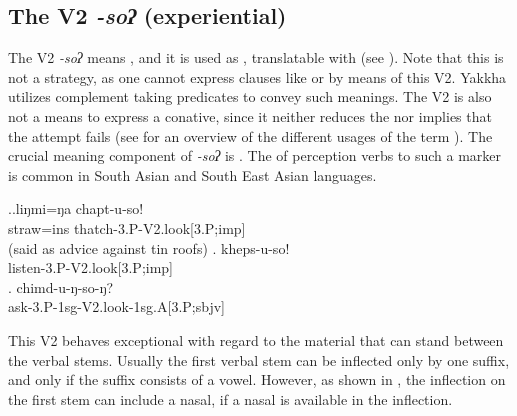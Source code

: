 \subsection{The V2 \emph{-soʔ}  (experiential)}\label{V2-look}%

The V2 \emph{-soʔ} means , and it is used as , translatable with  (see \Next). Note that this is not a  strategy,  as one cannot express clauses like  or  by means of  this V2. Yakkha utilizes complement taking predicates to convey such meanings. The V2 is also not a means to express a conative, since it neither  reduces the  nor implies that the attempt fails (see \citet{Vincent2013_Conative} for an overview of the different usages of the term ). The crucial meaning component of \emph{-soʔ} is . The  of  perception verbs to such a marker is common in South Asian and South East Asian languages. 

\ex.\ag.liŋmi=ŋa chapt-u-so!\\
straw{\sc =ins} thatch{\sc -3.P-V2.look[3.P;imp]}\\
 (said as advice against tin roofs)
\bg. kheps-u-so!\\
listen{\sc-3.P-V2.look[3.P;imp]}\\
\bg. chimd-u-ŋ-so-ŋ?\\
ask{\sc -3.P-1sg-V2.look-1sg.A[3.P;sbjv]}\\

This V2 behaves exceptional with regard to the material that can stand between the verbal stems. Usually the first verbal stem can be inflected only by one suffix, and only if the suffix consists of a vowel. However, as shown in \Last[c], the inflection on the first stem can include a nasal, if a nasal is available in the inflection.



